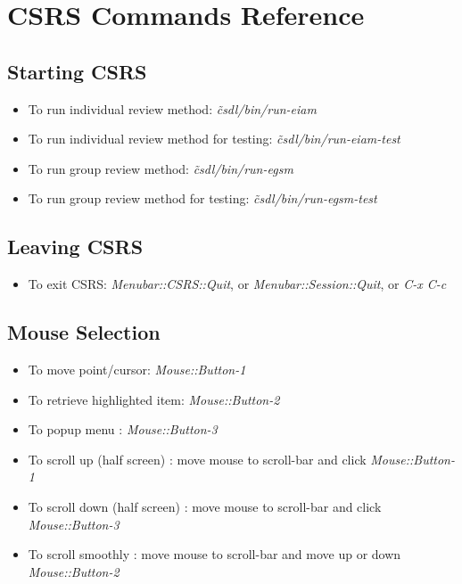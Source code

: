 
\chapter{CSRS Commands Reference}
\section* {Starting CSRS}
\begin{itemize}
\item To run individual review method: {\it \~csdl/bin/run-eiam}
\item To run individual review method for testing: {\it \~csdl/bin/run-eiam-test}
\item To run group review method: {\it \~csdl/bin/run-egsm}
\item To run group review method for testing: {\it \~csdl/bin/run-egsm-test}
\end{itemize}

\section* {Leaving CSRS}
\begin{itemize}
\item To exit CSRS:  {\it Menubar::CSRS::Quit}, or {\it Menubar::Session::Quit},
 or {\it C-x C-c}
\end{itemize}

\section* {Mouse Selection}
\begin{itemize}
\item To move point/cursor:  {\it Mouse::Button-1}
\item To retrieve highlighted item: {\it Mouse::Button-2}
\item To popup menu : {\it Mouse::Button-3}
\item To scroll up (half screen) : move mouse to scroll-bar and
click {\it Mouse::Button-1}
\item To scroll down (half screen) : move mouse to scroll-bar and
click {\it Mouse::Button-3}
\item To scroll smoothly : move mouse to scroll-bar and move up or
down  {\it Mouse::Button-2}
\end{itemize}


